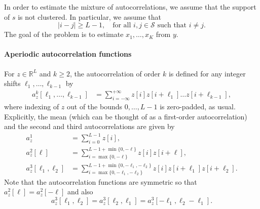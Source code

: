 \documentclass[english,11pt]{article}
\numberwithin{equation}{section}
\theoremstyle{plain}
\theoremstyle{definition}
\theoremstyle{remark}
\theoremstyle{plain}
\theoremstyle{remark}
\theoremstyle{plain}
\theoremstyle{plain}
\newcommand{\RL}{\mathbb{R}^L}
\newcommand{\SNR}{{\textsf{SNR}}}
\begin{document}
In order to estimate the mixture of autocorrelations, we assume that the support of $s$ is not clustered. In particular, we assume that
\begin{equation} \label{eq:spacing}
  \vert i-j \vert\geq L-1,   \quad \text{for all } i,j\in\mathcal{S} \text{ such that } i\neq j.
\end{equation}
The goal of the problem is to estimate $x_1,\ldots,x_K$ from $y$.


%
%

\paragraph{Aperiodic autocorrelation functions}
For  
$z\in\RL$ and $k\geq 2$, the autocorrelation of order $k$ is defined for any integer shifts $\ell_1, \ldots, \ell_{k-1}$ by
\begin{align}
	a_z^k[\ell_1,\ldots,\ell_{k-1}]  & = \sum_{i=-\infty}^{+\infty} z[i]z[i+\ell_1]\ldots z[i+\ell_{k-1}],
	\label{eq:ac_general}
\end{align}
where indexing of $z$ out of the bounds $0, \ldots, L-1$ is zero-padded, as usual.
Explicitly, the mean (which can be thought of as a first-order autocorrelation) and the second and third autocorrelations are given by
\begin{align} 
	a_z^1 & = \sum_{i=0}^{L-1} z[i], \nonumber\\
	a_z^2[\ell] & = \sum_{i = \max\{0, -\ell\}}^{L-1 + \min\{0, -\ell\}} z[i]z[i+\ell], \nonumber\\
	a_z^3[\ell_1,\ell_2] & = \sum_{i = \max\{0, -\ell_1, -\ell_2\}}^{L-1 + \min\{0, -\ell_1, -\ell_2\}} z[i]z[i+\ell_1]z[i+\ell_2]. \label{eq:ac_special}
\end{align}
Note that the autocorrelation functions are symmetric so that $a_z^2[\ell] = a_z^2[-\ell]$ and also $$a_z^3[\ell_1,\ell_2] = a_z^3[\ell_2,\ell_1]=a_z^3[-\ell_1,\ell_2-\ell_1].$$
\end{document}

